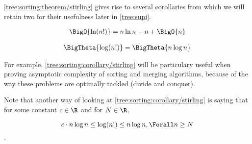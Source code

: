 \ref{tree:sorting:theorem/stirling} gives rise to several corollaries from which we will retain two for their usefulness later in \ref{tree:supi}.



\begin{corollary}
\begin{align*}
\BigO{\ln(n!)} &= n \ln n - n + \BigO{n}\\
\end{align*}
\end{corollary}



\begin{corollary}
\label{tree:sorting:corollary/stirling}
\begin{align*}
\BigTheta{\log(n!)} &= \BigTheta{n \log n}\\
\end{align*}
\end{corollary}


For example, \ref{tree:sorting:corollary/stirling} will be particulary useful when proving asymptotic complexity of sorting and merging algorithms, because of the way these problems are optimally tackled (divide and conquer).

Note that another way of looking at \ref{tree:sorting:corollary/stirling} is saying that for some constant $c \in \R$ and for $N \in \R$,


$$c \cdot n \log n \leq \log(n!) \leq n \log n, \Forall n \geq N$$.
